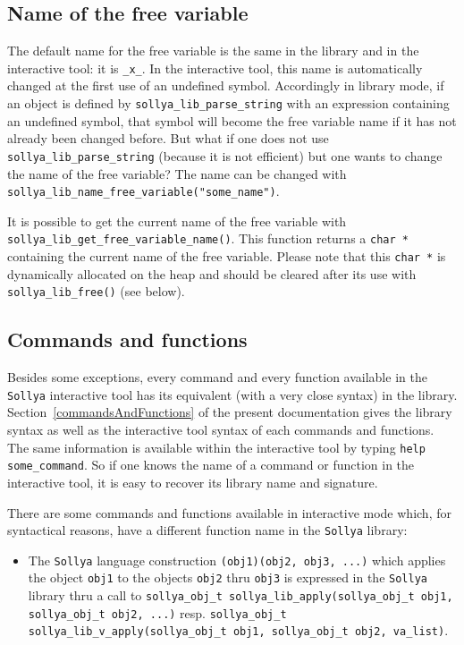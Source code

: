 \documentclass[a4paper]{article}
\newcommand{\sollya}{\texttt{Sollya}\xspace}
\begin{document}
\subsection{Name of the free variable}
The default name for the free variable is the same in the library and in the interactive tool: it is \texttt{\_x\_}. In the interactive tool, this name is automatically changed at the first use of an undefined symbol. Accordingly in library mode, if an object is defined by \texttt{sollya\_lib\_parse\_string} with an expression containing an undefined symbol, that symbol will become the free variable name if it has not already been changed before. But what if one does not use \texttt{sollya\_lib\_parse\_string} (because it is not efficient) but one wants to change the name of the free variable? The name can be changed with \texttt{sollya\_lib\_name\_free\_variable("some\_name")}.

It is possible to get the current name of the free variable with \texttt{sollya\_lib\_get\_free\_variable\_name()}. This function returns a \texttt{char *} containing the current name of the free variable. Please note that this \texttt{char *} is dynamically allocated on the heap and should be cleared after its use with \texttt{sollya\_lib\_free()} (see below).

\subsection{Commands and functions}
\label{library_commands_and_functions}
Besides some exceptions, every command and every function available in the \sollya interactive tool has its equivalent (with a very close syntax) in the library. Section~\ref{commandsAndFunctions} of the present documentation gives the library syntax as well as the interactive tool syntax of each commands and functions. The same information is available within the interactive tool by typing \texttt{help some\_command}. So if one knows the name of a command or function in the interactive tool, it is easy to recover its library name and signature.

There are some commands and functions available in interactive mode which, for syntactical reasons, have a different function name in the \sollya library:
\begin{itemize}
  \item The \sollya language construction \texttt{(obj1)(obj2, obj3, ...)} which applies the object \texttt{obj1} to the objects \texttt{obj2} thru \texttt{obj3} is expressed in the \sollya library thru a call to \texttt{sollya\_obj\_t sollya\_lib\_apply(sollya\_obj\_t obj1, sollya\_obj\_t obj2, ...)} resp. \texttt{sollya\_obj\_t sollya\_lib\_v\_apply(sollya\_obj\_t obj1, sollya\_obj\_t obj2, va\_list)}.
\end{itemize}
\end{document}
